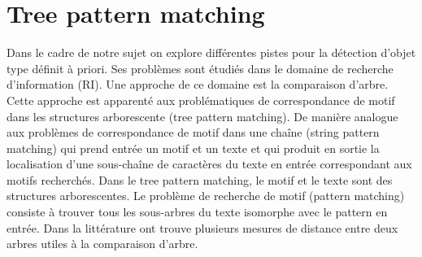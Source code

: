 \section{Tree pattern matching}
Dans le cadre de notre sujet on explore différentes pistes pour la détection d'objet type définit à priori. Ses problèmes sont étudiés dans le domaine de recherche d'information (RI). 
Une approche de ce domaine est la comparaison d'arbre. Cette approche est apparenté aux problématiques de correspondance de motif dans les structures arborescente (tree pattern matching). De manière analogue aux problèmes de correspondance de motif dans une chaîne (string pattern matching) qui prend entrée un motif et un texte et qui produit en sortie la localisation d'une sous-chaîne de caractères du texte en entrée correspondant aux motifs recherchés. Dans le tree pattern matching, le motif et  le texte sont des structures arborescentes. Le problème de recherche de motif (pattern matching) consiste à trouver tous les sous-arbres du texte isomorphe avec le pattern en entrée. 
Dans la littérature ont trouve plusieurs mesures de distance entre deux arbres utiles à la comparaison d'arbre. 
